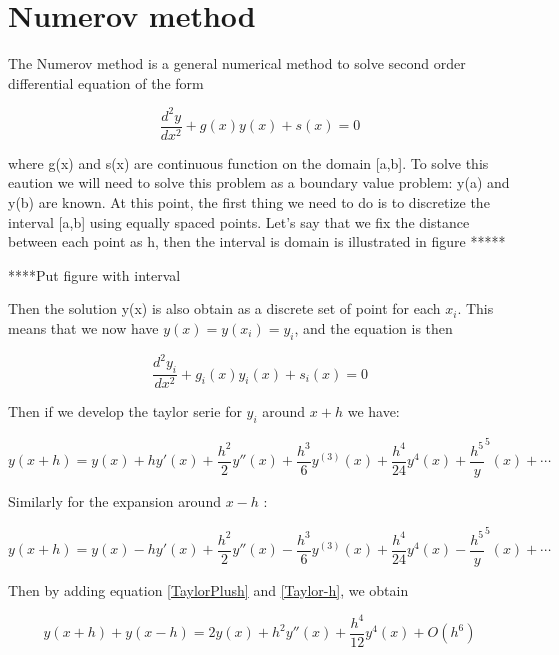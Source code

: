 \documentclass[12pt,twocolumn]{article}
\begin{document}
\tableofcontents
\pagebreak


\section{Numerov method}
The Numerov method is a general numerical method to solve second order differential equation of the form

\begin{equation}
  \frac{d^2y}{dx^2} +g(x)y(x)+s(x) = 0
  \label{NumerovDifEquation}
\end{equation}

where g(x) and s(x) are continuous function on the domain [a,b]. To solve this eaution we will need to solve this problem as a boundary value problem: y(a) and y(b) are known. At this point,
the first thing we need to do is to discretize the interval [a,b] using equally spaced points. Let's say that we fix the distance between each point as h, then the interval is domain is 
illustrated in figure *****

****Put figure with interval

Then the solution y(x) is also obtain as a discrete set of point for each $x_i$. This means that we now have $y(x)=y(x_i)=y_i$, and the equation is then 

\begin{equation}
  \frac{d^2y_i}{dx^2} +g_i(x)y_i(x)+s_i(x) = 0
  \label{NumerovEqDiscrete}
\end{equation}

Then if we develop the taylor serie for $y_i$ around $x+h$ we have:

\begin{equation}
  y(x+h) = y(x) + hy'(x) + \frac{h^2}{2}y''(x) + \frac{h^3}{6}y^{(3)}(x) + \frac{h^4}{24}y^{4}(x) + \frac{h^5}y^{5}(x) + \cdots
  \label{TaylorPlush}
\end{equation}

Similarly for the expansion around $x-h$ :

\begin{equation}
  y(x+h) = y(x) - hy'(x) + \frac{h^2}{2}y''(x) - \frac{h^3}{6}y^{(3)}(x) + \frac{h^4}{24}y^{4}(x) - \frac{h^5}y^{5}(x) + \cdots
  \label{Taylor-h}
\end{equation}

Then by adding equation \ref{TaylorPlush} and \ref{Taylor-h}, we obtain 

\begin{equation}
  y(x+h) + y(x-h) = 2y(x) + h^2y''(x) + \frac{h^4}{12}y^{4}(x) + O(h^6)
  \label{AddingEq}
\end{equation}
\end{document}
